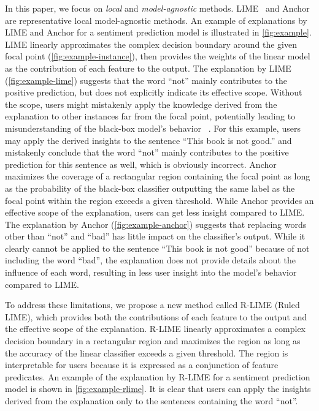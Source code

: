 \documentclass[runningheads]{llncs}
\begin{document}
{In this paper,
we focus on \emph{local} and \emph{model-agnostic} methods.
LIME~\cite{ribeiro2016why} and Anchor~\cite{ribeiro2018anchors}
are representative local model-agnostic methods.
An example of explanations by LIME and Anchor
for a sentiment prediction model is illustrated in \cref{fig:example}.
LIME linearly approximates the complex decision boundary
around the given focal point (\cref{fig:example-instance}),
then provides the weights of the linear model as the contribution of each feature
to the output.
The explanation by LIME (\cref{fig:example-lime}) suggests that
the word ``not'' mainly contributes to the positive prediction,
but does not explicitly indicate its effective scope.
Without the scope,
users might mistakenly apply the knowledge derived from the explanation
to other instances far from the focal point,
potentially leading to misunderstanding of the black-box model's behavior
~\cite{ribeiro2018anchors}.
For this example,
users may apply the derived insights
to the sentence ``This book is not good.'' %
and mistakenly conclude that the word ``not''
mainly contributes to the positive prediction for this sentence as well,
which is obviously incorrect.
Anchor maximizes the coverage of a rectangular region containing the focal point
as long as the probability of the black-box classifier outputting
the same label as the focal point within the region exceeds a given threshold.
While Anchor provides an effective scope of the explanation,
users can get less insight compared to LIME\@.
The explanation by Anchor (\cref{fig:example-anchor})
suggests that replacing words other than ``not'' and ``bad''
has little impact on the classifier's output.
While it clearly cannot be applied to the sentence ``This book is not good''
because of not including the word ``bad'',
the explanation does not provide details about the influence of each word,
resulting in less user insight into the model's behavior compared to LIME\@.

To address these limitations,
we propose a new method called R-LIME (Ruled LIME),
which provides both the contributions of each feature to the output
and the effective scope of the explanation.
R-LIME linearly approximates a complex decision boundary
in a rectangular region and maximizes the region
as long as the accuracy of the linear classifier exceeds a given threshold.
The region is interpretable for users because it is
expressed as a conjunction of feature predicates.
An example of the explanation by R-LIME for a sentiment prediction model
is shown in \cref{fig:example-rlime}.
It is clear that users can apply the insights derived from the explanation
only to the sentences containing the word ``not''.

}
\end{document}
